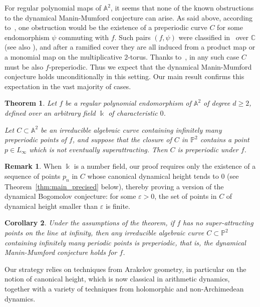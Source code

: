 \documentclass[11 pt, oneside, a4paper]{amsart}
\newcommand{\C}{\mathbb{C}}
\renewcommand{\P}{\mathbb{P}}
\newcommand{\nA}{\mathbb{A}}
\newcommand{\nP}{\mathbb{P}}
\newcommand{\eps}{\varepsilon}
\newcommand{\nk}{\Bbbk}
\newtheorem{introthm}{Theorem}
\newtheorem{introcor}[introthm]{Corollary}
\theoremstyle{definition}
\newtheorem{rmk-intro}{Remark}
\theoremstyle{definition}
\begin{document}
For regular polynomial maps of $\nA^2$, it seems that none of the known obstructions to the dynamical Manin-Mumford conjecture can arise. As said above, according to~\cite{GT21}, 
one obstruction would be the existence of a preperiodic  curve $C$ for some endomorphism $\psi$ commuting with $f$. Such pairs $(f,\psi)$ were classified in~\cite{dinh:commuting} over $\C$ (see also \cite{dinh-sibony:commuting, kaufmann}), and after a ramified cover they are all induced from a product map or a monomial map on the multiplicative $2$-torus. 
Thanks to~\cite{GNY1}, in any such case $C$ must be also $f$-preperiodic.
 Thus we expect that the dynamical Manin-Mumford conjecture 
holds unconditionally in this setting. 
Our main result confirms this expectation in the vast majority of cases. 



\begin{introthm}\label{thm:DMM}
Let $f$ be a regular polynomial endomorphism of $\nA^2$ of degree $d \geq 2$, 
defined over an arbitrary  field $\nk$ of characteristic $0$. 

Let  $C \subset \nA^2$ be an irreducible algebraic curve containing infinitely many preperiodic points of $f$, and suppose that 
the  closure of $C$   in $\nP^2$ contains a point $p\in L_\infty$ 
which is not eventually superattracting. 
Then $C$ is  preperiodic under $f$. 
\end{introthm}


\begin{rmk-intro}
{When $\nk$ is a number field, our proof requires only the existence of a sequence of points $p_n$ in $C$ whose canonical dynamical height
tends to $0$ (see Theorem~\ref{thm:main_precised} below),
thereby proving a version of the dynamical Bogomolov conjecture: 
for some $\eps>0$, the set of points in $C$ of dynamical height smaller than $\eps$ is finite.}
\end{rmk-intro}

\begin{introcor}\label{cor:DMM}
Under the assumptions of the theorem, if $f$ has no super-attracting points on the line at infinity, then 
any irreducible algebraic curve $C \subset \P^2$
containing  infinitely many periodic points is preperiodic, that is, the dynamical Manin-Mumford conjecture holds for $f$.
\end{introcor}

 Our strategy relies on techniques from Arakelov geometry, in particular on the notion 
of canonical height, which is now classical in arithmetic dynamics, together with a variety of techniques from 
holomorphic and non-Archimedean dynamics. 
\end{document}
